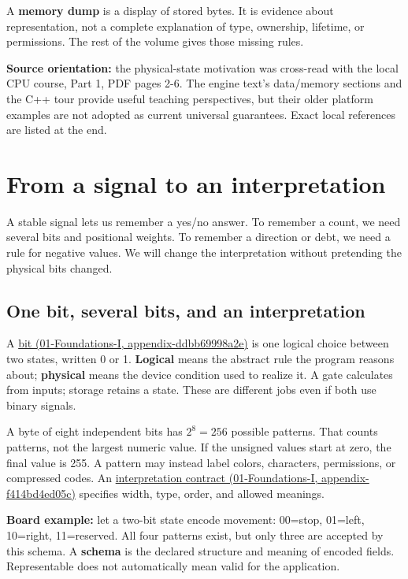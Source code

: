 A \textbf{memory dump} is a display of stored bytes. It is evidence about representation, not a complete explanation of type, ownership, lifetime, or permissions. The rest of the volume gives those missing rules.

\textbf{Source orientation:} the physical-state motivation was cross-read with the local CPU course, Part 1, PDF pages 2-6. The engine text's data/memory sections and the C++ tour provide useful teaching perspectives, but their older platform examples are not adopted as current universal guarantees. Exact local references are listed at the end.

\section{From a signal to an interpretation}\label{05-engine-i-ch001-from-a-signal-to-an-interpretation}

A stable signal lets us remember a yes/no answer. To remember a count, we need several bits and positional weights. To remember a direction or debt, we need a rule for negative values. We will change the interpretation without pretending the physical bits changed.

\subsection{One bit, several bits, and an interpretation}\label{05-engine-i-ch001-one-bit-several-bits-and-an-interpretation}

A \href{../01-Foundations-I/main.pdf\#nameddest=appendix-ddbb69998a2e}{bit (01-Foundations-I, appendix-ddbb69998a2e)} is one logical choice between two states, written 0 or 1. \textbf{Logical} means the abstract rule the program reasons about; \textbf{physical} means the device condition used to realize it. A gate calculates from inputs; storage retains a state. These are different jobs even if both use binary signals.

A byte of eight independent bits has \(2^8=256\) possible patterns. That counts patterns, not the largest numeric value. If the unsigned values start at zero, the final value is 255. A pattern may instead label colors, characters, permissions, or compressed codes. An \href{../01-Foundations-I/main.pdf\#nameddest=appendix-f414bd4ed05c}{interpretation contract (01-Foundations-I, appendix-f414bd4ed05c)} specifies width, type, order, and allowed meanings.

\textbf{Board example:} let a two-bit state encode movement: 00=stop, 01=left, 10=right, 11=reserved. All four patterns exist, but only three are accepted by this schema. A \textbf{schema} is the declared structure and meaning of encoded fields. Representable does not automatically mean valid for the application.

